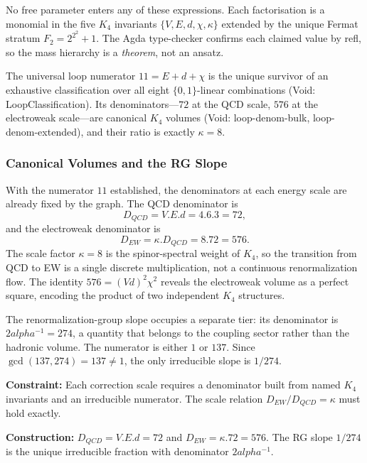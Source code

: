\documentclass[11pt,a4paper]{book}
\def\alpha{alpha}%
\def\cdot{.}%
\def\mathrm#1{#1}%
\def\texttt#1{#1}%
\begin{document}
No free parameter enters any of these expressions.  Each factorisation
is a monomial in the five $K_4$ invariants $\{V, E, d, \chi, \kappa\}$
extended by the unique Fermat stratum $F_2 = 2^{2^2} + 1$.  The
Agda type-checker confirms each claimed value by \texttt{refl}, so the
mass hierarchy is a \emph{theorem}, not an ansatz.

The universal loop numerator $11 = E + d + \chi$ is the unique survivor of
an exhaustive classification over all eight $\{0,1\}$-linear combinations
(Void: \texttt{LoopClassification}).
Its denominators---$72$ at the QCD scale, $576$ at the electroweak
scale---are canonical $K_4$ volumes (Void: \texttt{loop-denom-bulk},
\texttt{loop-denom-extended}), and their ratio is exactly $\kappa = 8$.

\subsubsection*{Canonical Volumes and the RG Slope}

With the numerator $11$ established, the denominators at each energy
scale are already fixed by the graph.  The QCD denominator is
\[
  D_{\mathrm{QCD}} = V \cdot E \cdot d = 4 \cdot 6 \cdot 3 = 72,
\]
and the electroweak denominator is
\[
  D_{\mathrm{EW}} = \kappa \cdot D_{\mathrm{QCD}} = 8 \cdot 72 = 576.
\]
The scale factor $\kappa = 8$ is the spinor-spectral weight of $K_4$,
so the transition from QCD to EW is a single discrete multiplication,
not a continuous renormalization flow.  The identity $576 = (Vd)^2 \chi^2$
reveals the electroweak volume as a perfect square, encoding the
product of two independent $K_4$ structures.

The renormalization-group slope occupies a separate tier: its
denominator is $2\alpha^{-1} = 274$, a quantity that belongs to the
coupling sector rather than the hadronic volume.  The numerator is
either $1$ or $137$.  Since $\gcd(137, 274) = 137 \neq 1$, the only
irreducible slope is $1/274$.

\textbf{Constraint:}
Each correction scale requires a denominator built from named $K_4$
invariants and an irreducible numerator.  The scale relation
$D_{\mathrm{EW}} / D_{\mathrm{QCD}} = \kappa$ must hold exactly.

\textbf{Construction:}
$D_{\mathrm{QCD}} = V \cdot E \cdot d = 72$
and $D_{\mathrm{EW}} = \kappa \cdot 72 = 576$.  The RG slope $1/274$
is the unique irreducible fraction with denominator $2\alpha^{-1}$.
\end{document}
